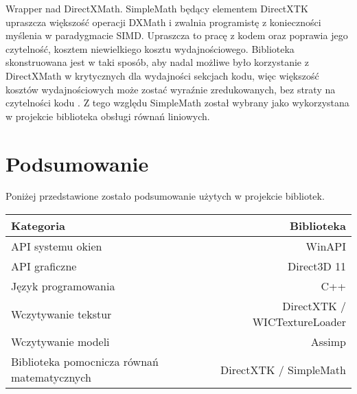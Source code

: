 Wrapper nad DirectXMath. SimpleMath będący elementem DirectXTK upraszcza
większość operacji DXMath i zwalnia programistę z konieczności myślenia
w paradygmacie SIMD. Upraszcza to pracę z kodem oraz poprawia jego
czytelność, kosztem niewielkiego kosztu wydajnościowego. Biblioteka
skonstruowana jest w taki sposób, aby nadal możliwe było korzystanie z
DirectXMath w krytycznych dla wydajności sekcjach kodu, więc większość
kosztów wydajnościowych może zostać wyraźnie zredukowanych, bez straty
na czytelności kodu \cite{github:directxtk:simplemath:2024}. Z tego względu SimpleMath został wybrany
jako wykorzystana w projekcie biblioteka obsługi równań liniowych.

\section{Podsumowanie}

Poniżej przedstawione zostało podsumowanie użytych w projekcie
bibliotek.



\begin{center}
	\begin{tabular}{ |l r| }
		\hline
		\textbf{Kategoria} & \textbf{Biblioteka} \\
		\hline
		API systemu okien & WinAPI \\
		API graficzne & Direct3D 11 \\
		Język programowania & C++ \\ 
		Wczytywanie tekstur & DirectXTK / WICTextureLoader \\
		Wczytywanie modeli & Assimp \\
		Biblioteka pomocnicza równań matematycznych & DirectXTK / SimpleMath \\
		\hline
	\end{tabular}
\end{center}